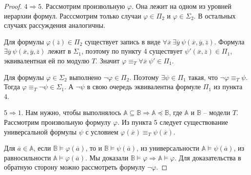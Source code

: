 \begin{proof}

    
    $4\Rightarrow 5$. Рассмотрим произвольную $\varphi$. Она лежит на одном из уровней иерархии формул. Расссмотрим только случаи $\varphi\in \Pi_2$ и $\varphi\in\Sigma_2$. В остальных случаях рассуждения аналогичны.

    Для формулы $\varphi(\overline{z})\in\Pi_2$ существует запись в виде $\forall \overline{x}~\exists \overline{y}~\psi(\overline{x}, \overline{y}, \overline{z})$. Формула $\exists \overline{y}~\psi(\overline{x}, \overline{y}, \overline{z})$ лежит в $\Sigma_1$, поэтому по пункту 4 существует $\psi'(\overline{x}, \overline{z})\in\Pi_1$, эквивалентная ей по модулю $T$. Значит $\varphi \equiv_T \forall \overline{x}~\psi' \in \Pi_1$.

    Для формулы $\varphi\in\Sigma_2$ выполнено $\neg\varphi\in\Pi_2$. Поэтому $\exists\psi\in\Pi_1$ такая, что $\neg\varphi \equiv_T \psi$. Тогда $\varphi\equiv_T\neg\psi\in\Sigma_1$. А $\neg\psi$ в свою очередь эквивалентна формуле $\Pi_1$ из пункта 4.

    $5 \Rightarrow 1$. Нам нужно, чтобы выполнялось $\mathbb{A} \subseteq \mathbb{B} \Rightarrow \mathbb{A} \preceq \mathbb{B}$, где $\mathbb{A}$ и $\mathbb{B}$ -- модели $T$. Рассмотрим произвольную формулу $\varphi$. Из пункта 5 следует существование универсальной формулы $\psi$ с условием $\varphi(\overline{x}) \equiv_T \psi(\overline{x})$.


    Для $\overline{a}\in\mathbb{A}$, если $\mathbb{B} \models \varphi(\overline{a})$, то и $\mathbb{B} \models  \psi(\overline{a})$, из универсальности $\mathbb{A} \models \psi(\overline{a})$, из равносильности $\mathbb{A}\models\varphi(\overline{a})$. Мы доказали $\mathbb{B}\models\varphi\Rightarrow\mathbb{A}\models\varphi$. Для доказательства в обратную сторону можно рассмотреть формулу $\neg\varphi$.
\end{proof} 

